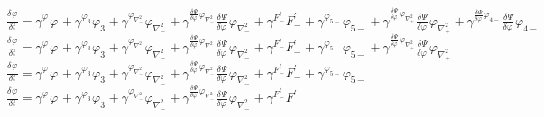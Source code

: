 $\frac{{\delta}^{} \varphi_{{}}}{{\delta} {t}^{}} = {\gamma}^{{{\varphi_{{}}}^{}}}{{\varphi_{{}}}^{}} + {\gamma}^{{{\varphi_{3{}}}^{}}}{{\varphi_{3{}}}^{}} + {\gamma}^{{{{\varphi}_{\scriptscriptstyle{\nabla^2_{-}}}}^{}}}{{{\varphi}_{\scriptscriptstyle{\nabla^2_{-}}}}^{}} + {\gamma}^{{{\frac{{\delta}^{} \Psi}{{\delta} {\varphi_{{}}}^{}}}^{}{{\varphi}_{\scriptscriptstyle{\nabla^2_{-}}}}^{}}}{{\frac{{\delta}^{} \Psi}{{\delta} {\varphi_{{}}}^{}}}^{}{{\varphi}_{\scriptscriptstyle{\nabla^2_{-}}}}^{}} + {\gamma}^{{{{{F}^{\prime}_{-}}}^{}}}{{{{F}^{\prime}_{-}}}^{}} + {\gamma}^{{{{\varphi}_{5{-}}}^{}}}{{{\varphi}_{5{-}}}^{}} + {\gamma}^{{{\frac{{\delta}^{} \Psi}{{\delta} {\varphi_{{}}}^{}}}^{}{\varphi_{\scriptscriptstyle{\nabla^2_{+}}}}^{}}}{{\frac{{\delta}^{} \Psi}{{\delta} {\varphi_{{}}}^{}}}^{}{\varphi_{\scriptscriptstyle{\nabla^2_{+}}}}^{}} + {\gamma}^{{{\frac{{\delta}^{} \Psi}{{\delta} {\varphi_{{}}}^{}}}^{}{{\varphi}_{4{-}}}^{}}}{{\frac{{\delta}^{} \Psi}{{\delta} {\varphi_{{}}}^{}}}^{}{{\varphi}_{4{-}}}^{}}$
$\frac{{\delta}^{} \varphi_{{}}}{{\delta} {t}^{}} = {\gamma}^{{{\varphi_{{}}}^{}}}{{\varphi_{{}}}^{}} + {\gamma}^{{{\varphi_{3{}}}^{}}}{{\varphi_{3{}}}^{}} + {\gamma}^{{{{\varphi}_{\scriptscriptstyle{\nabla^2_{-}}}}^{}}}{{{\varphi}_{\scriptscriptstyle{\nabla^2_{-}}}}^{}} + {\gamma}^{{{\frac{{\delta}^{} \Psi}{{\delta} {\varphi_{{}}}^{}}}^{}{{\varphi}_{\scriptscriptstyle{\nabla^2_{-}}}}^{}}}{{\frac{{\delta}^{} \Psi}{{\delta} {\varphi_{{}}}^{}}}^{}{{\varphi}_{\scriptscriptstyle{\nabla^2_{-}}}}^{}} + {\gamma}^{{{{{F}^{\prime}_{-}}}^{}}}{{{{F}^{\prime}_{-}}}^{}} + {\gamma}^{{{{\varphi}_{5{-}}}^{}}}{{{\varphi}_{5{-}}}^{}} + {\gamma}^{{{\frac{{\delta}^{} \Psi}{{\delta} {\varphi_{{}}}^{}}}^{}{\varphi_{\scriptscriptstyle{\nabla^2_{+}}}}^{}}}{{\frac{{\delta}^{} \Psi}{{\delta} {\varphi_{{}}}^{}}}^{}{\varphi_{\scriptscriptstyle{\nabla^2_{+}}}}^{}}$
$\frac{{\delta}^{} \varphi_{{}}}{{\delta} {t}^{}} = {\gamma}^{{{\varphi_{{}}}^{}}}{{\varphi_{{}}}^{}} + {\gamma}^{{{\varphi_{3{}}}^{}}}{{\varphi_{3{}}}^{}} + {\gamma}^{{{{\varphi}_{\scriptscriptstyle{\nabla^2_{-}}}}^{}}}{{{\varphi}_{\scriptscriptstyle{\nabla^2_{-}}}}^{}} + {\gamma}^{{{\frac{{\delta}^{} \Psi}{{\delta} {\varphi_{{}}}^{}}}^{}{{\varphi}_{\scriptscriptstyle{\nabla^2_{-}}}}^{}}}{{\frac{{\delta}^{} \Psi}{{\delta} {\varphi_{{}}}^{}}}^{}{{\varphi}_{\scriptscriptstyle{\nabla^2_{-}}}}^{}} + {\gamma}^{{{{{F}^{\prime}_{-}}}^{}}}{{{{F}^{\prime}_{-}}}^{}} + {\gamma}^{{{{\varphi}_{5{-}}}^{}}}{{{\varphi}_{5{-}}}^{}}$
$\frac{{\delta}^{} \varphi_{{}}}{{\delta} {t}^{}} = {\gamma}^{{{\varphi_{{}}}^{}}}{{\varphi_{{}}}^{}} + {\gamma}^{{{\varphi_{3{}}}^{}}}{{\varphi_{3{}}}^{}} + {\gamma}^{{{{\varphi}_{\scriptscriptstyle{\nabla^2_{-}}}}^{}}}{{{\varphi}_{\scriptscriptstyle{\nabla^2_{-}}}}^{}} + {\gamma}^{{{\frac{{\delta}^{} \Psi}{{\delta} {\varphi_{{}}}^{}}}^{}{{\varphi}_{\scriptscriptstyle{\nabla^2_{-}}}}^{}}}{{\frac{{\delta}^{} \Psi}{{\delta} {\varphi_{{}}}^{}}}^{}{{\varphi}_{\scriptscriptstyle{\nabla^2_{-}}}}^{}} + {\gamma}^{{{{{F}^{\prime}_{-}}}^{}}}{{{{F}^{\prime}_{-}}}^{}}$
